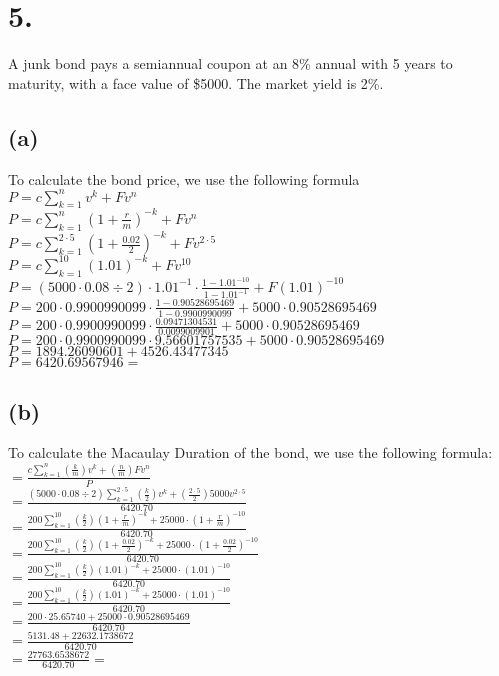 \documentclass{article}
\begin{document}
\section*{5.}
{\Large 

A junk bond pays a semiannual coupon at an 8\% annual with 5 years to maturity, with a face value of \$5000. The market yield is 2\%.

\subsection*{(a)}

To calculate the bond price, we use the following formula \\
$P = c \sum_{k=1}^{n} v^k + Fv^n$ \\
$P = c \sum_{k=1}^{n} (1 + \frac{r}{m})^{-k} + Fv^n$ \\
$P = c \sum_{k=1}^{2 \cdot 5} (1 + \frac{0.02}{2})^{-k} + Fv^{2 \cdot 5}$ \\
$P = c \sum_{k=1}^{10} (1.01)^{-k} + Fv^{10}$ \\ 
$P = (5000 \cdot 0.08 \div 2) \cdot 1.01^{-1} \cdot \frac{1 - 1.01^{-10}}{1 - 1.01^{-1}} + F(1.01)^{-10}$ \\
$P = 200 \cdot 0.9900990099 \cdot \frac{1 - 0.90528695469}{1 - 0.9900990099} + 5000 \cdot 0.90528695469$ \\
$P = 200 \cdot 0.9900990099 \cdot \frac{0.09471304531}{0.0099009901} + 5000 \cdot 0.90528695469$ \\
$P = 200 \cdot 0.9900990099 \cdot 9.56601757535 + 5000 \cdot 0.90528695469$ \\
$P = 1894.26090601 + 4526.43477345$ \\
$P = 6420.69567946 = $ 

\subsection*{(b)}

To calculate the Macaulay Duration of the bond, we use the following formula: \\
$= \frac{c \sum_{k=1}^{n} (\frac{k}{m}) v^k + (\frac{n}{m})Fv^n}{P}$ \\
$= \frac{(5000 \cdot 0.08 \div 2) \sum_{k=1}^{2 \cdot 5} (\frac{k}{2}) v^k + (\frac{2 \cdot 5}{2})5000v^{2 \cdot 5}}{6420.70}$ \\
$= \frac{200 \sum_{k=1}^{10} (\frac{k}{2}) (1 + \frac{r}{m})^{-k} + 25000\cdot {(1 + \frac{r}{m})}^{-10}}{6420.70}$ \\
$= \frac{200 \sum_{k=1}^{10} (\frac{k}{2}) (1 + \frac{0.02}{2})^{-k} + 25000 \cdot {(1 + \frac{0.02}{2})}^{-10}}{6420.70}$ \\
$= \frac{200 \sum_{k=1}^{10} (\frac{k}{2}) (1.01)^{-k} + 25000 \cdot (1.01)^{-10}}{6420.70}$ \\
$= \frac{200 \sum_{k=1}^{10} (\frac{k}{2}) (1.01)^{-k} + 25000 \cdot (1.01)^{-10}}{6420.70}$ \\
$= \frac{200 \cdot 25.65740 + 25000 \cdot 0.90528695469}{6420.70}$ \\
$= \frac{5131.48 + 22632.1738672}{6420.70}$ \\
$= \frac{27763.6538672}{6420.70} = $ 

}
\end{document}
